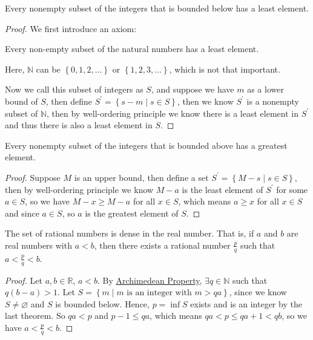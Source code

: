 \begin{theorem}
  Every nonempty subset of the integers that is bounded below has a least element.
\end{theorem}

\begin{proof}
  We first introduce an axiom:
  \begin{theorem}
    Every non-empty subset of the natural numbers has a least element.
  \end{theorem}
  \begin{note}
    Here, \(\mathbb{N} \) can be \(\left\{ 0,1,2,\dots  \right\} \) or \(\left\{ 1,2,3,\dots  \right\} \), which is not that important.
  \end{note}
  Now we call this subset of integers as \(S\), and suppose we have \(m\) as a lower bound of \(S\), then define \(S^{\prime} = \left\{ s - m \mid s \in S \right\} \), then we know \(S^{\prime} \) is a nonempty subset of \(\mathbb{N} \), then by well-ordering principle we know there is a least element in \(S^{\prime} \)  and thus there is also a least element in \(S\). 
\end{proof}

\begin{corollary}
  Every nonempty subset of the integers that is bounded above has a greatest element.
\end{corollary}
\begin{proof}
  Suppose \(M\) is an upper bound, then define a set \(S^{\prime} = \left\{ M - s \mid s \in S \right\} \), then by well-ordering principle we know \(M - a\) is the least element of \(S^{\prime} \) for some \(a \in S\), so we have \(M - x \ge M - a\) for all \(x \in S\), which means \(a \ge x\) for all \(x \in S\) and since \(a \in S\), so \(a\) is the greatest element of \(S\).          
\end{proof}

\begin{theorem}
  The set of rational numbers is dense in the real number. That is, if \(a\) and \(b\) are real numbers with \(a<b\), then there exists a rational number \(\frac{p}{q}\) such that \(a < \frac{p}{q} < b\).     
\end{theorem}
\begin{proof}
  Let \(a,b \in \mathbb{R} \), \(a<b\). By \hyperref[thm: Archimedean property]{Archimedean Property}, \(\exists q \in \mathbb{N} \) such that \(q(b-a)>1\). Let \(S = \left\{ m \mid m \text{ is an integer with } m > qa \right\} \), since we know \(S \neq \varnothing \) and \(S\) is bounded below. Hence, \(p=\inf S\) exists and is an integer by the last theorem. So \(qa < p\) and \(p-1\le qa\), which means \(qa<p \le qa+1 < qb\), so we have \(a < \frac{p}{q} < b\). 
\end{proof}
